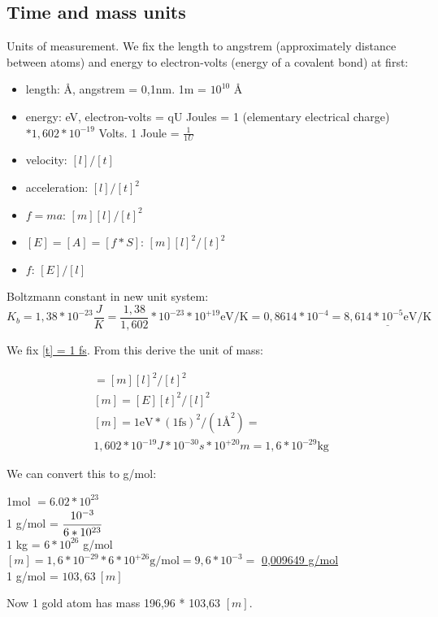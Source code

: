 \documentclass[12pt,a4paper]{article}
\begin{document}
\subsection*{Time and mass units}

Units of measurement. We fix the length to angstrem (approximately distance between atoms) and energy to electron-volts (energy of a covalent bond) at first:

\begin{itemize}
	\item length: Å, angstrem = 0,1nm. 1m = $10^{10}$ Å
	\item energy: eV, electron-volts = qU Joules = 1 (elementary electrical charge) $* 1,602 * 10^{-19}$ Volts. 1 Joule = $\frac{1}{1U}$
	\item velocity: $[l]/[t]$
	\item acceleration: $[l]/[t]^2$
	\item $f=ma$:       $[m][l]/[t]^2$
	\item $[E]=[A]=[f*S]$:    $[m][l]^2/[t]^2$
	\item $f$: $[E]/[l]$
\end{itemize}

Boltzmann constant in new unit system: \[ K_b = 1,38 * 10^{-23} \frac{J}{K} = \frac{1,38}{1,602} * 10^{-23} * 10^{+19} \text{eV/K} = 0,8614 * 10^{-4} = \underline{8,614 * 10^{-5} \text{eV/K}} \]

We fix \underline{[t] = 1 fs}. From this derive the unit of mass: 

\begin{gather*}
	[E] = [m][l]^2/[t]^2\\
	[m] = [E][t]^2/[l]^2\\
	[m] = 1 \text{eV} * (1 \text{fs})^2 / (1 \text{Å}^2) =\\
	1,602 * 10^{-19} J * 10^{-30} s * 10^{+20} m = 1,6 * 10^{-29} \text{kg}
\end{gather*}

We can convert this to g/mol:
\begin{center}
	1mol $= 6.02 * 10^{23}$\\
	1 g/mol = $\cfrac{10^{-3}}{6 * 10^{23}} $\\
	1 kg = $6 * 10^{26}$ g/mol\\
	$[m] = 1,6 * 10^{-29} * 6 * 10^{+26} \text{g/mol} = 9,6 * 10^{-3} =$ \underline{0,009649 g/mol}\\
	1 g/mol = $103,63\ [m]$
\end{center}

Now 1 gold atom has mass 196,96 * 103,63 $[m]$.
\end{document}
